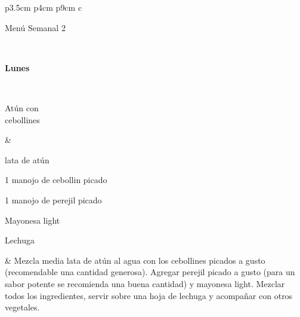 \documentclass[menu.tex]{subfiles}
\begin{document}
            
\begin{tabular} {p{3.5cm} p{4cm} p{9cm}}        
 { c }{\begin{LARGE}Menú Semanal 2\end{LARGE}}\\
\hline
    
\pbox{20cm}
{
    \rule{0pt}{3ex}\begin{large}\textbf{Lunes}\end{large}\\ 
    \rule{0pt}{2ex}Atún con \\cebollines
}&
\vspace{-0.5cm}
\begin{compactitem} 
    \begin{footnotesize}
        \item {} lata de atún
        \item 1 manojo de cebollin picado
        \item 1 manojo de perejil picado
        \item Mayonesa light
        \item Lechuga
    \end{footnotesize}
\end{compactitem}&
\vspace{-0.5cm}
Mezcla media lata de atún al agua con los cebollines picados a gusto (recomendable una cantidad generosa). Agregar perejil picado a gusto (para un sabor potente se recomienda una buena cantidad) y mayonesa light. Mezclar todos los ingredientes, servir sobre una hoja de lechuga y acompañar con otros vegetales.\\
\hline
    

\end{tabular}
\end{document}
